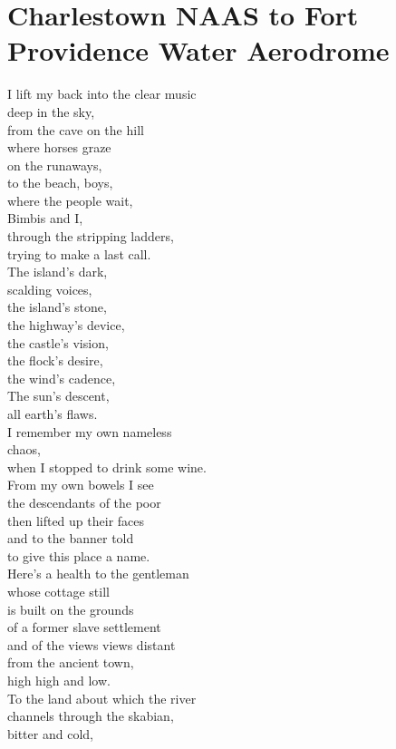 \documentclass[smalldemyvopaper,11pt,twoside,onecolumn,openright,extrafontsizes]{memoir}
\begin{document}
\chapter{Charlestown NAAS to Fort Providence Water Aerodrome}
I lift my back into the clear music
\\deep in the sky,
\\from the cave on the hill
\\where horses graze
\\on the runaways,
\\to the beach, boys,
\\where the people wait,
\\Bimbis and I,
\\through the stripping ladders,
\\trying to make a last call.
\\The island's dark,
\\scalding voices,
\\the island's stone,
\\the highway's device,
\\the castle's vision,
\\the flock's desire,
\\the wind's cadence,
\\The sun's descent,
\\all earth's flaws.
\\I remember my own nameless
\\chaos,
\\when I stopped to drink some wine.
\\From my own bowels I see
\\the descendants of the poor
\\then lifted up their faces
\\and to the banner told
\\to give this place a name.
\\Here's a health to the gentleman
\\whose cottage still
\\is built on the grounds
\\of a former slave settlement
\\and of the views views distant
\\from the ancient town,
\\high high and low.
\\To the land about which the river
\\channels through the skabian,
\\bitter and cold,
\end{document}

